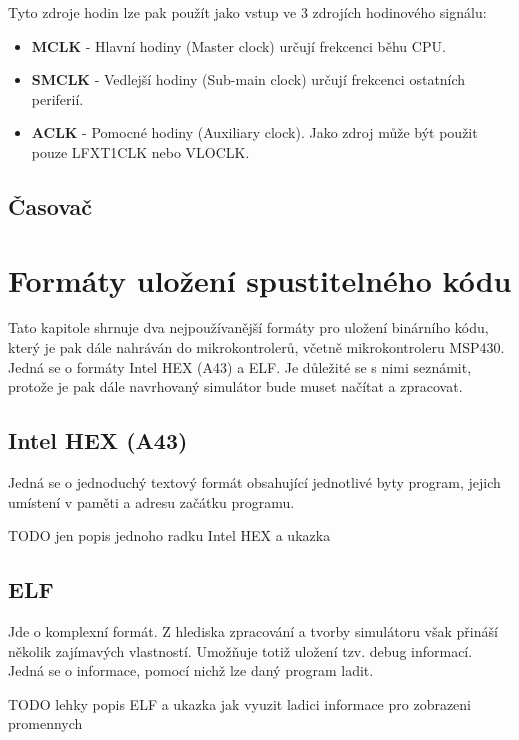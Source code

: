 Tyto zdroje hodin lze pak použít jako vstup ve 3 zdrojích hodinového signálu:

\begin{itemize}
\item \textbf{MCLK} - Hlavní hodiny (Master clock) určují frekcenci běhu CPU.
\item \textbf{SMCLK} - Vedlejší hodiny (Sub-main clock) určují frekcenci ostatních periferií.
\item \textbf{ACLK} - Pomocné hodiny (Auxiliary clock). Jako zdroj může být použit pouze LFXT1CLK nebo VLOCLK.
\end{itemize}

\section{Časovač}

\chapter{Formáty uložení spustitelného kódu}

Tato kapitole shrnuje dva nejpoužívanější formáty pro uložení binárního kódu, který je pak dále nahráván do mikrokontrolerů, včetně mikrokontroleru MSP430. Jedná se o formáty Intel HEX (A43) a ELF. Je důležité se s nimi seznámit, protože je pak dále navrhovaný simulátor bude muset načítat a zpracovat.

\section{Intel HEX (A43)}

Jedná se o jednoduchý textový formát obsahující jednotlivé byty program, jejich umístení v paměti a adresu začátku programu.

TODO jen popis jednoho radku Intel HEX a ukazka

\section{ELF}

Jde o komplexní formát. Z hlediska zpracování a tvorby simulátoru však přináší několik zajímavých vlastností. Umožňuje totiž uložení tzv. debug informací. Jedná se o informace, pomocí nichž lze daný program ladit.

TODO lehky popis ELF a ukazka jak vyuzit ladici informace pro zobrazeni promennych



